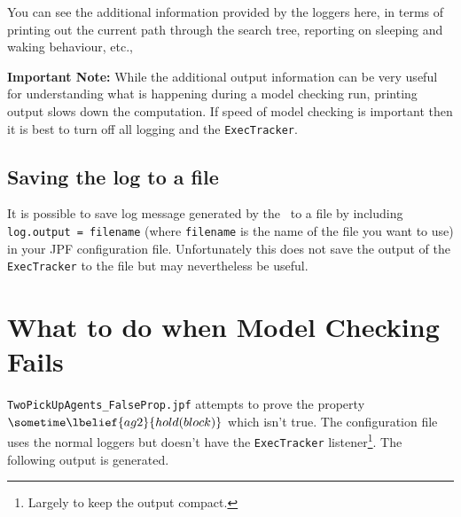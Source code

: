 \documentclass[a4]{article}
\begin{document}
You can see the additional information provided by the loggers here, in terms of printing out the current path through the search tree, reporting on sleeping and waking behaviour, etc.,

{\bf Important Note:} While the additional output information can be very useful for understanding what is happening during a model checking run, printing output slows down the computation.  If speed of model checking is important then it is best to turn off all logging and the \texttt{ExecTracker}.

\subsection{Saving the log to a file}
It is possible to save log message generated by the \ail\ to a file by including \texttt{log.output = filename} (where \texttt{filename} is the name of the file you want to use) in your JPF configuration file.  Unfortunately this does not save the output of the \texttt{ExecTracker} to the file but may nevertheless be useful.

\section{What to do when Model Checking Fails}

\texttt{TwoPickUpAgents\_FalseProp.jpf} attempts to prove the property $\sometime \lbelief{ag2}{hold(block)}$ which isn't true.  The configuration file uses the normal loggers but doesn't have the \texttt{ExecTracker} listener\footnote{Largely to keep the output compact.}.  The following output is generated.
\end{document}
